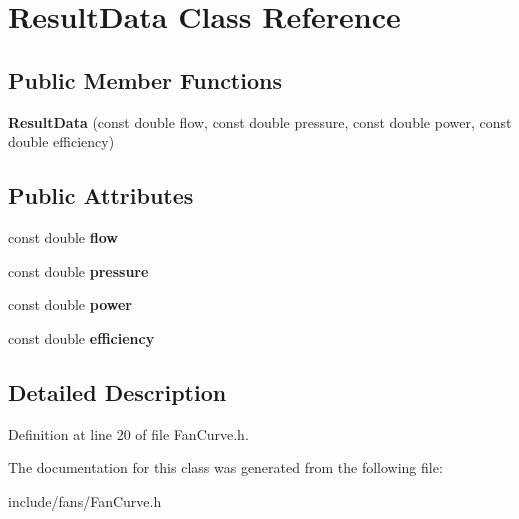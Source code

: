 \hypertarget{class_result_data}{}\section{Result\+Data Class Reference}
\label{class_result_data}
\subsection*{Public Member Functions}
\begin{DoxyCompactItemize}
\item 
\mbox{\label{class_result_data_ab10ba8e317d8b9d830c5f90debfbb15b}} 
{\bfseries Result\+Data} (const double flow, const double pressure, const double power, const double efficiency)
\end{DoxyCompactItemize}
\subsection*{Public Attributes}
\begin{DoxyCompactItemize}
\item 
\mbox{\label{class_result_data_ae8459ee960a807938dfe6eaa265531cc}} 
const double {\bfseries flow}
\item 
\mbox{\label{class_result_data_a496cd3f0c80f254fcf2ebd7f3476e6dd}} 
const double {\bfseries pressure}
\item 
\mbox{\label{class_result_data_a990344826f779c300db9e3128f160c1e}} 
const double {\bfseries power}
\item 
\mbox{\label{class_result_data_a1b75ddc30c8470877bc93bfa6ccafa0e}} 
const double {\bfseries efficiency}
\end{DoxyCompactItemize}


\subsection{Detailed Description}


Definition at line 20 of file Fan\+Curve.\+h.



The documentation for this class was generated from the following file\+:\begin{DoxyCompactItemize}
\item 
include/fans/Fan\+Curve.\+h\end{DoxyCompactItemize}
